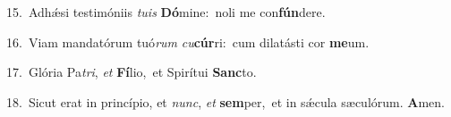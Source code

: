 {\numbfont\textcolor{\numbcolor}{15.}}~Adhǽsi testimóniis \textit{tu}\-\textit{is} \textbf{Dó}\-mine:~\star noli me con\-\textbf{fún}\-dere.\par
{\numbfont\textcolor{\numbcolor}{16.}}~Viam mandatórum tuó\textit{rum} \textit{cu}\-\textbf{cúr}ri:~\star cum dilatásti cor \textbf{me}\-um.\par
{\numbfont\textcolor{\numbcolor}{17.}}~Glória Pa\-\textit{tri}\-, \textit{et} \textbf{Fí}\-lio,~\star et Spirítui \textbf{Sanc}\-to.\par
{\numbfont\textcolor{\numbcolor}{18.}}~Sicut erat in princípio, et \textit{nunc}\-, \textit{et} \textbf{sem}\-per,~\star et in sǽcula sæculórum. \textbf{A}\-men.\par
